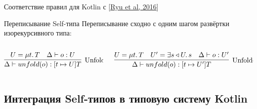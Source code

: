 \documentclass[usenames, dvipsnames]{beamer}
\begin{document}
\begin{frame}{Соответствие правил для Kotlin с [\href{https://dl.acm.org/doi/pdf/10.1145/2888392}{Ryu et al, 2016}]}
        \begin{block}{Переписывание Self-типа}
            Переписывание сходно с одним шагом развёртки изорекурсивного типа:
            \vspace{-1em}
            \begin{columns}[onlytextwidth]
                \begin{column}[t]{0.41\textwidth}
                    \[
                        \infer[\text{Unfold-Self}]{
                            \Delta \vdash unfold(o) : [t \mapsto U]T
                        }{
                            U = \mu t \ldotp T & \Delta \vdash o : U
                        }
                    \]
                \end{column}\hfill%
                \begin{column}[t]{0.58\textwidth}
                    \[
                        \infer[\text{Unfold-NoSelf}]{
                            \Delta \vdash unfold(o) : [t \mapsto U']T
                        }{
                            U = \mu t \ldotp T
                            &
                            U' = \exists s \triangleleft U \ldotp s
                            &
                            \Delta \vdash o : U'
                        }
                    \]
                \end{column}
            \end{columns}
        \end{block}
    \end{frame}


    \subsection{Интеграция Self-типов в типовую систему Kotlin}
\end{document}
